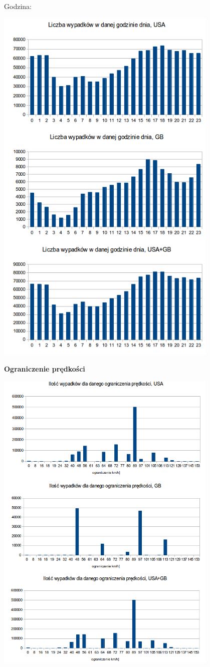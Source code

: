 Godzina:\\\centerline{\includegraphics[width=0.8\textwidth]{images/statistics/hour.png}}

\textbf{Ograniczenie prędkości}

\centerline{\includegraphics[width=0.8\textwidth]{images/statistics/speed_limit.png}}

